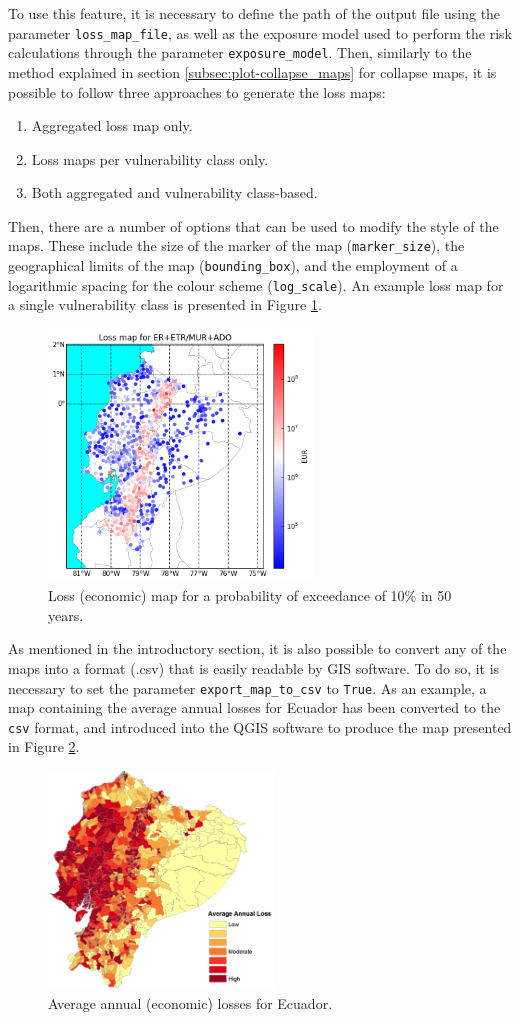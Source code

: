 To use this feature, it is necessary to define the path of the output file using the parameter \verb=loss_map_file=, as well as the exposure model used to perform the risk calculations through the parameter \verb=exposure_model=. Then, similarly to the method explained in section \ref{subsec:plot-collapse_maps} for collapse maps, it is possible to follow three approaches to generate the loss maps:\\

\begin{enumerate}
\item Aggregated loss map only.
\item Loss maps per vulnerability class only.
\item Both aggregated and vulnerability class-based.\\
\end{enumerate}

Then, there are a number of options that can be used to modify the style of the maps. These include the size of the marker of the map (\verb=marker_size=), the geographical limits of the map (\verb=bounding_box=), and the employment of a logarithmic spacing for the colour scheme (\verb=log_scale=). An example loss map for a single vulnerability class is presented in Figure \ref{fig:loss_map}.

\begin{figure}[htb]
  \centering
      \includegraphics[width=7cm]{figures/loss_map.png}
  \caption{Loss (economic) map for a probability of exceedance of 10\% in 50 years.}
  \label{fig:loss_map}
\end{figure}

As mentioned in the introductory section, it is also possible to convert any of the maps into a format (.csv) that is easily readable by GIS software. To do so, it is necessary to set the parameter \verb=export_map_to_csv= to \verb=True=. As an example, a map containing the average annual losses for Ecuador has been converted to the \verb=csv= format, and introduced into the QGIS software to produce the map presented in Figure \ref{fig:all_loss_map}.

\begin{figure}[htb]
  \centering
      \includegraphics[width=6cm]{figures/loss_map_AAL.png}
  \caption{Average annual (economic) losses for Ecuador.}
  \label{fig:all_loss_map}
\end{figure}
